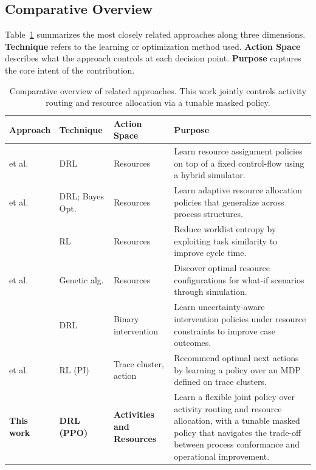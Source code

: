 \documentclass[runningheads]{llncs}
\begin{document}
\subsection{Comparative Overview}
\label{subsec:comparative_overview}

Table~\ref{tab:related_work} summarizes the most closely related approaches along three dimensions.
\textbf{Technique} refers to the learning or optimization method used. \textbf{Action Space} describes what
the approach controls at each decision point. \textbf{Purpose} captures the core intent of the contribution.


\begin{table}[!ht]
\centering
\scriptsize
\setlength{\tabcolsep}{2.5pt}
\renewcommand{\arraystretch}{1.05}

\begin{tabularx}{\textwidth}{@{}
  >{\RaggedRight\arraybackslash}p{2.0cm}
  >{\RaggedRight\arraybackslash}p{1.5cm}
  >{\RaggedRight\arraybackslash}p{1.5cm}
  >{\RaggedRight\arraybackslash}X
@{}}
\toprule
\textbf{Approach} & \textbf{Technique} & \textbf{Action Space} & \textbf{Purpose} \\
\midrule
\citeauthor{Optimizing_Resource_Allocation_Policies} et al.~\cite{Optimizing_Resource_Allocation_Policies} & DRL & Resources &
Learn resource assignment policies on top of a fixed control-flow using a hybrid simulator. \\
\citeauthor{Learning_policies_drl} et al.~\cite{Learning_policies_drl} & DRL; Bayes Opt. & Resources &
Learn adaptive resource allocation policies that generalize across process structures. \\
\citeauthor{Resource_allocation_using_task_similarity}~\cite{Resource_allocation_using_task_similarity} & RL & Resources &
Reduce worklist entropy by exploiting task similarity to improve cycle time. \\
\citeauthor{genetic_resource_allocations} et al.~\cite{genetic_resource_allocations} & Genetic alg. & Resources &
Discover optimal resource configurations for what-if scenarios through simulation. \\
\citeauthor{ppm_resource_constraints}~\cite{ppm_resource_constraints} & DRL & Binary intervention &
Learn uncertainty-aware intervention policies under resource constraints to improve case outcomes. \\
\citeauthor{ppm_optimal_policy_temporal_data} et al.~\cite{ppm_optimal_policy_temporal_data} & RL (PI) & Trace cluster, action &
Recommend optimal next actions by learning a policy over an MDP defined on trace clusters. \\
\hline
\textbf{This work} & \textbf{DRL (PPO)} & \textbf{Activities and Resources} &
Learn a flexible joint policy over activity routing and resource allocation, with a tunable masked policy
that navigates the trade-off between process conformance and operational improvement. \\
\bottomrule
\end{tabularx}
\caption{Comparative overview of related approaches. This work jointly controls activity routing and resource allocation via a tunable masked policy.}
\label{tab:related_work}
\end{table}
\end{document}
